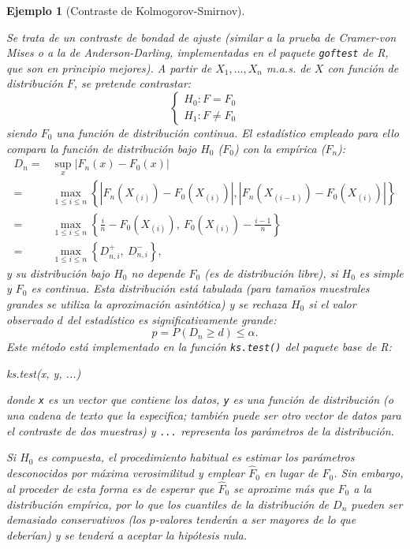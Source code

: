 \documentclass[
]{book}
\newenvironment{Shaded}{\begin{snugshade}}{\end{snugshade}}
\newcommand{\FunctionTok}[1]{\textcolor[rgb]{0.00,0.00,0.00}{#1}}
\newcommand{\NormalTok}[1]{#1}
\theoremstyle{break}
\newtheorem{example}{Ejemplo}[chapter]
\theoremstyle{nonumberplain}
\begin{document}
\begin{example}[Contraste de Kolmogorov-Smirnov]
\protect\hypertarget{exm:ks-test-sim-exp}{}\label{exm:ks-test-sim-exp}

Se trata de un contraste de bondad de ajuste (similar a la prueba de
Cramer-von Mises o a la de Anderson-Darling, implementadas en el paquete
\texttt{goftest} de R, que son en principio mejores).
A partir de \(X_1,\ldots ,X_n\) m.a.s. de \(X\) con función de distribución \(F\),
se pretende contrastar:
\[\left \{ 
\begin{array}{l}
H_0 : F = F_0 \\ 
H_1 : F \neq F_0 
\end{array}
\right. \]
siendo \(F_0\) una función de distribución continua.
El estadístico empleado para ello compara la función de distribución bajo
\(H_0\) (\(F_0\)) con la empírica (\(F_n\)):
\[\begin{aligned}
    D_n=&\sup_{x}|F_n(x)-F_0(x)| \\
    =&\max_{1 \leq i\leq n}\left \{
    |F_n(X_{(i)})-F_0(X_{(i)})|,|F_n(X_{(i-1)})-F_0(X_{(i)})|\right \} \\
    =&\max_{1 \leq i\leq n}\left \{ \frac{i}{n}-F_0(X_{(i)}), \ F_0(X_{(i)})-\frac{i-1}{n}\right \} \\
    =&\max_{1 \leq i\leq n}\left \{ D_{n,i}^{+},\ D_{n,i}^{-}\right \},
\end{aligned}\]
y su distribución bajo \(H_0\) no depende \(F_0\) (es de distribución libre),
si \(H_0\) es simple y \(F_0\) es continua.
Esta distribución está tabulada (para tamaños muestrales grandes se utiliza
la aproximación asintótica) y se rechaza \(H_0\) si el valor observado \(d\)
del estadístico es significativamente grande:
\[p = P \left( D_n \geq d \right) \leq \alpha.\]
Este método está implementado en la función \texttt{ks.test()} del paquete base de R:

\begin{Shaded}
\begin{Highlighting}[]
\FunctionTok{ks.test}\NormalTok{(x, y, ...)}
\end{Highlighting}
\end{Shaded}

donde \texttt{x} es un vector que contiene los datos, \texttt{y} es una función de distribución
(o una cadena de texto que la especifica; también puede ser otro vector de datos
para el contraste de dos muestras) y \texttt{...} representa los parámetros de la distribución.

Si \(H_0\) es compuesta, el procedimiento habitual es estimar los parámetros desconocidos
por máxima verosimilitud y emplear \(\hat{F}_0\) en lugar de \(F_0\).
Sin embargo, al proceder de esta forma es de esperar que \(\hat{F}_0\) se aproxime más
que \(F_0\) a la distribución empírica, por lo que los cuantiles de la distribución de
\(D_n\) pueden ser demasiado conservativos (los \(p\)-valores tenderán a ser mayores de
lo que deberían) y se tenderá a aceptar la hipótesis nula.


\end{example}
\end{document}
